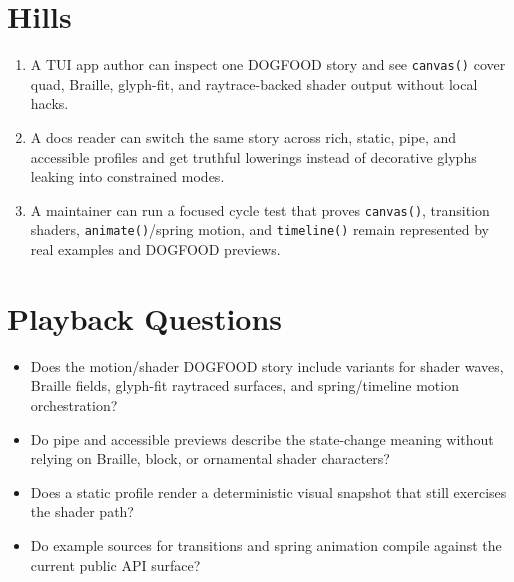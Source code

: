 \section{Hills}\label{record-098-hills}

\begin{enumerate}
\def\labelenumi{\arabic{enumi}.}
\tightlist
\item
  A TUI app author can inspect one DOGFOOD story and see \texttt{c\allowbreak{}a\allowbreak{}n\allowbreak{}v\allowbreak{}a\allowbreak{}s\allowbreak{}(\allowbreak{})} cover quad, Braille, glyph-fit, and raytrace-backed shader output without local hacks.
\item
  A docs reader can switch the same story across rich, static, pipe, and accessible profiles and get truthful lowerings instead of decorative glyphs leaking into constrained modes.
\item
  A maintainer can run a focused cycle test that proves \texttt{c\allowbreak{}a\allowbreak{}n\allowbreak{}v\allowbreak{}a\allowbreak{}s\allowbreak{}(\allowbreak{})}, transition shaders, \texttt{a\allowbreak{}n\allowbreak{}i\allowbreak{}m\allowbreak{}a\allowbreak{}t\allowbreak{}e\allowbreak{}(\allowbreak{})}/spring motion, and \texttt{t\allowbreak{}i\allowbreak{}m\allowbreak{}e\allowbreak{}l\allowbreak{}i\allowbreak{}n\allowbreak{}e\allowbreak{}(\allowbreak{})} remain represented by real examples and DOGFOOD previews.
\end{enumerate}

\section{Playback Questions}\label{record-098-playback-questions}

\begin{itemize}
\tightlist
\item
  Does the motion/shader DOGFOOD story include variants for shader waves, Braille fields, glyph-fit raytraced surfaces, and spring/timeline motion orchestration?
\item
  Do pipe and accessible previews describe the state-change meaning without relying on Braille, block, or ornamental shader characters?
\item
  Does a static profile render a deterministic visual snapshot that still exercises the shader path?
\item
  Do example sources for transitions and spring animation compile against the current public API surface?
\end{itemize}

